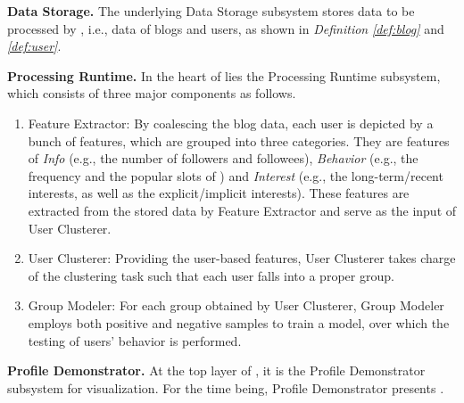 \textbf{Data Storage.} The underlying Data Storage subsystem stores data to be processed by \sys{}, i.e., data of blogs and users, as shown in \textit{Definition} \textit{\ref{def:blog}} and \textit{\ref{def:user}}.

\textbf{Processing Runtime.}
In the heart of \sys{} lies the Processing Runtime subsystem, which consists of three major components as follows.
\begin{enumerate}
	\item Feature Extractor: By coalescing the blog data, each user is depicted by a bunch of features, which are grouped into three categories. They are features of \textit{Info} (e.g., the number of followers and followees), \textit{Behavior} (e.g., the frequency and the popular slots of \retg{}) and \textit{Interest} (e.g., the long-term/recent interests, as well as the explicit/implicit interests). These features are extracted from the stored data by Feature Extractor and serve as the input of User Clusterer.
	\item User Clusterer: Providing the user-based features, User Clusterer takes charge of the clustering task such that each user falls into a proper group.
	\item Group Modeler: For each group obtained by User Clusterer, Group Modeler employs both positive and negative samples to train a model, over which the testing of users' \retg{} behavior is performed.
\end{enumerate}
	
\textbf{Profile Demonstrator.} At the top layer of \sys{}, it is the Profile Demonstrator subsystem for visualization.
For the time being, Profile Demonstrator presents \tbc{}.



